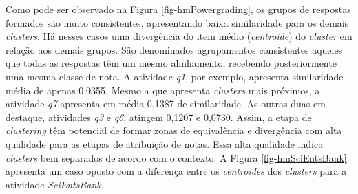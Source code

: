 Como pode ser observado na Figura \ref{fig-hmPowergrading}, os grupos de respostas formados são muito consistentes, apresentando baixa similaridade para os demais \textit{clusters}. Há nesses casos uma divergência do item médio (\textit{centroide}) do \textit{cluster} em relação aos demais grupos.  São denominados agrupamentos consistentes aqueles que todas as respostas têm um mesmo alinhamento, recebendo posteriormente uma mesma classe de nota. A atividade \textit{q1}, por exemplo, apresenta similaridade média de apenas 0,0355. Mesmo a que apresenta \textit{clusters} mais próximos, a atividade \textit{q7} apresenta em média 0,1387 de similaridade. As outras duas em destaque, atividades \textit{q3} e \textit{q6}, atingem 0,1207 e 0,0730. Assim, a etapa de \textit{clustering} têm potencial de formar zonas de equivalência e divergência com alta qualidade para as etapas de atribuição de notas. Essa alta qualidade indica \textit{clusters} bem separados de acordo com o contexto. A Figura \ref{fig-hmSciEntsBank} apresenta um caso oposto com a diferença entre os \textit{centroides} dos \textit{clusters} para a atividade \textit{SciEntsBank}.

